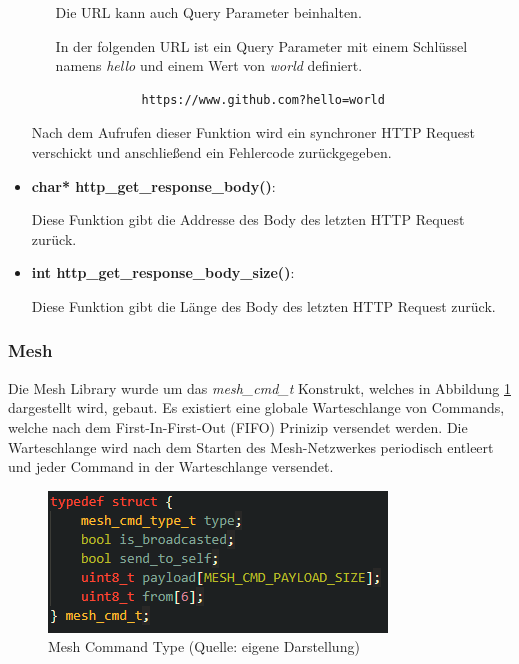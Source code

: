 \begin{itemize}
\begin{itemize}
        Die URL kann auch Query Parameter beinhalten. 

        In der folgenden URL ist ein Query Parameter mit einem Schlüssel namens \textit{hello} und einem Wert von \textit{world} definiert.

        \begin{verbatim}
            https://www.github.com?hello=world
        \end{verbatim}
    \end{itemize}
    
    Nach dem Aufrufen dieser Funktion wird ein synchroner HTTP Request verschickt und anschließend ein Fehlercode zurückgegeben.

    \item \textbf{char* http\_get\_response\_body()}:
    
    Diese Funktion gibt die Addresse des Body des letzten HTTP Request zurück.

    \item \textbf{int http\_get\_response\_body\_size()}:
    
    Diese Funktion gibt die Länge des Body des letzten HTTP Request zurück.
\end{itemize}

\subsubsection{Mesh}\label{sec:own-libraries-mesh}

Die Mesh Library wurde um das \textit{mesh\_cmd\_t} Konstrukt, welches in Abbildung \ref{abb:mesh_cmd_t} dargestellt wird, gebaut. Es existiert eine globale Warteschlange von Commands, welche nach dem First-In-First-Out (FIFO) Prinizip versendet werden. Die Warteschlange wird nach dem Starten des Mesh-Netzwerkes periodisch entleert und jeder Command in der Warteschlange versendet.

\begin{figure}[H]
    \begin{center}
        \includegraphics[scale=1]{images/mesh_cmd_t.png}
        \caption{Mesh Command Type (Quelle: eigene Darstellung)}
        \label{abb:mesh_cmd_t}
    \end{center}
\end{figure}

